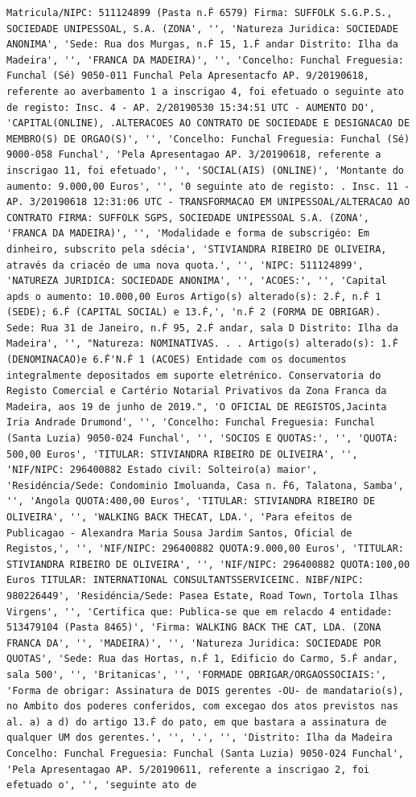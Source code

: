 \documentclass[
  12pt,
]{article}
\begin{document}
\begin{verbatim}
Matricula/NIPC: 511124899 (Pasta n.Ḟ 6579) Firma: SUFFOLK S.G.P.S., SOCIEDADE UNIPESSOAL, S.A. (ZONA', '', 'Natureza Juridica: SOCIEDADE ANONIMA', 'Sede: Rua dos Murgas, n.Ḟ 15, 1.Ḟ andar Distrito: Ilha da Madeira', '', 'FRANCA DA MADEIRA)', '', 'Concelho: Funchal Freguesia: Funchal (Sé) 9050-011 Funchal Pela Apresentacfo AP. 9/20190618, referente ao averbamento 1 a inscrigao 4, foi efetuado o seguinte ato de registo: Insc. 4 - AP. 2/20190530 15:34:51 UTC - AUMENTO DO', 'CAPITAL(ONLINE), .ALTERACOES AO CONTRATO DE SOCIEDADE E DESIGNACAO DE MEMBRO(S) DE ORGAO(S)', '', 'Concelho: Funchal Freguesia: Funchal (Sé) 9000-058 Funchal', 'Pela Apresentagao AP. 3/20190618, referente a inscrigao 11, foi efetuado', '', 'SOCIAL(AIS) (ONLINE)', 'Montante do aumento: 9.000,00 Euros', '', '0 seguinte ato de registo: . Insc. 11 - AP. 3/20190618 12:31:06 UTC - TRANSFORMACAO EM UNIPESSOAL/ALTERACAO AO CONTRATO FIRMA: SUFFOLK SGPS, SOCIEDADE UNIPESSOAL S.A. (ZONA', 'FRANCA DA MADEIRA)', '', 'Modalidade e forma de subscrigéo: Em dinheiro, subscrito pela sdécia', 'STIVIANDRA RIBEIRO DE OLIVEIRA, através da criacéo de uma nova quota.', '', 'NIPC: 511124899', 'NATUREZA JURIDICA: SOCIEDADE ANONIMA', '', 'ACOES:', '', 'Capital apds o aumento: 10.000,00 Euros Artigo(s) alterado(s): 2.Ḟ, n.Ḟ 1 (SEDE); 6.Ḟ (CAPITAL SOCIAL) e 13.Ḟ,', 'n.Ḟ 2 (FORMA DE OBRIGAR). Sede: Rua 31 de Janeiro, n.Ḟ 95, 2.Ḟ andar, sala D Distrito: Ilha da Madeira', '', "Natureza: NOMINATIVAS. . . Artigo(s) alterado(s): 1.Ḟ (DENOMINACAO)e 6.Ḟ'N.Ḟ 1 (ACOES) Entidade com os documentos integralmente depositados em suporte eletrénico. Conservatoria do Registo Comercial e Cartério Notarial Privativos da Zona Franca da Madeira, aos 19 de junho de 2019.", 'O OFICIAL DE REGISTOS,Jacinta Iria Andrade Drumond', '', 'Concelho: Funchal Freguesia: Funchal (Santa Luzia) 9050-024 Funchal', '', 'SOCIOS E QUOTAS:', '', 'QUOTA: 500,00 Euros', 'TITULAR: STIVIANDRA RIBEIRO DE OLIVEIRA', '', 'NIF/NIPC: 296400882 Estado civil: Solteiro(a) maior', 'Residéncia/Sede: Condominio Imoluanda, Casa n. Ḟ6, Talatona, Samba', '', 'Angola QUOTA:400,00 Euros', 'TITULAR: STIVIANDRA RIBEIRO DE OLIVEIRA', '', 'WALKING BACK THECAT, LDA.', 'Para efeitos de Publicagao - Alexandra Maria Sousa Jardim Santos, Oficial de Registos,', '', 'NIF/NIPC: 296400882 QUOTA:9.000,00 Euros', 'TITULAR: STIVIANDRA RIBEIRO DE OLIVEIRA', '', 'NIF/NIPC: 296400882 QUOTA:100,00 Euros TITULAR: INTERNATIONAL CONSULTANTSSERVICEINC. NIBF/NIPC: 980226449', 'Residéncia/Sede: Pasea Estate, Road Town, Tortola Ilhas Virgens', '', 'Certifica que: Publica-se que em relacdo 4 entidade: 513479104 (Pasta 8465)', 'Firma: WALKING BACK THE CAT, LDA. (ZONA FRANCA DA', '', 'MADEIRA)', '', 'Natureza Juridica: SOCIEDADE POR QUOTAS', 'Sede: Rua das Hortas, n.Ḟ 1, Edificio do Carmo, 5.Ḟ andar, sala 500', '', 'Britanicas', '', 'FORMADE OBRIGAR/ORGAOSSOCIAIS:', 'Forma de obrigar: Assinatura de DOIS gerentes -OU- de mandatario(s), no Ambito dos poderes conferidos, com excegao dos atos previstos nas al. a) a d) do artigo 13.Ḟ do pato, em que bastara a assinatura de qualquer UM dos gerentes.', '', '.', '', 'Distrito: Ilha da Madeira Concelho: Funchal Freguesia: Funchal (Santa Luzia) 9050-024 Funchal', 'Pela Apresentagao AP. 5/20190611, referente a inscrigao 2, foi efetuado o', '', 'seguinte ato de 
\end{verbatim}
\end{document}
